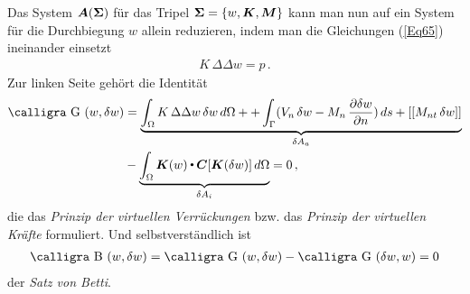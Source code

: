 Das System $\mbox{\boldmath $A$}(\mbox{\boldmath $\Sigma$})$ f\"{u}r das Tripel $\mbox{\boldmath $\Sigma$} = \{w, \mbox{\boldmath $K$}, \mbox{\boldmath $M$}\}$ kann man nun auf ein System f\"{u}r die Durchbiegung $w$ allein reduzieren, indem man die Gleichungen (\ref{Eq65}) ineinander einsetzt
\begin{align}
 K\,\Delta\Delta w = p\,.
\end{align}
Zur linken Seite geh\"{o}rt die Identit\"{a}t
\begin{align}\label{GPlatte}
\text{\normalfont\calligra G\,\,}(w,\delta w) &= \underbrace{\int_{\Omega}K\,\Delta \Delta w \,\delta w\,d\Omega + + \int_{\Gamma} (V_n\,\delta w - M_n\,\frac{\partial \delta w}{\partial n}) \,ds + [[M_{nt}\,\delta w]]}_{\delta A_a}\nn \\
 &- \underbrace{\int_{\Omega} \vek K(w) \dotprod \vek C[\vek K(\delta w)] \,d\Omega}_{\delta A_i} = 0\,,
\end{align}
die das {\em Prinzip der virtuellen Verr\"{u}ckungen\/} bzw. das {\em Prinzip der virtuellen Kr\"{a}fte\/} formuliert. Und selbstverst\"{a}ndlich ist
\begin{align}
\text{\normalfont\calligra B\,\,}(w,\delta w) = \text{\normalfont\calligra G\,\,}(w,\delta w) - \text{\normalfont\calligra G\,\,}(\delta w,w) = 0
\end{align}
der {\em Satz von Betti\/}.



